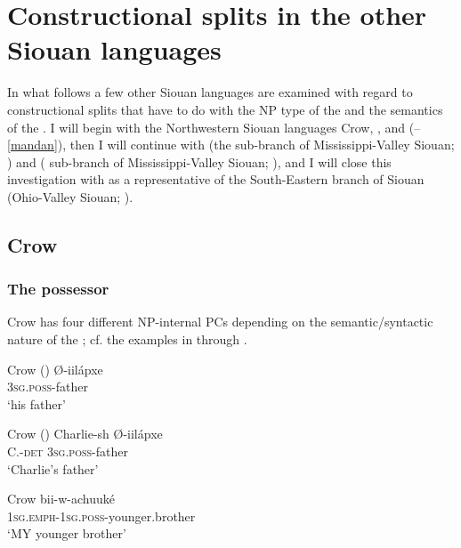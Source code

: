 \documentclass[output=paper]{LSP/langsci}
\begin{document}
\section{Constructional splits in the other Siouan languages}

In what follows a few other Siouan languages are examined with regard to constructional splits that have to do with the NP type of the  and the semantics of the . I will begin with the Northwestern Siouan languages Crow, , and  (--\ref{mandan}), then I will continue with  (the  sub-branch of Mississippi-Valley Siouan; ) and  ( sub-branch of Mississippi-Valley Siouan; ), and I will close this investigation with  as a representative of the South-Eastern branch of Siouan (Ohio-Valley Siouan; ).
 
\subsection{Crow}\label{sec:helmbrecht:4.1} \label{crow} 
\subsubsection{The possessor}
Crow has four different NP-internal PCs depending on the semantic/syntactic nature of the ; cf. the examples in  through . 

\ea {}Crow (\citealt[234]{Graczyk2007}) \label{crowfather}
\ex
\gll Ø-iilápxe \\
\textsc{3sg.poss}-father \\
\glt `his father'
\z
\z

\ea {}Crow (\citealt[234]{Graczyk2007}) \label{crowcharlie}
\ex
\gll Charlie-sh 		Ø-iilápxe \\
C.-\textsc{det}      \textsc{3sg.poss}-father \\
\glt `Charlie's father'
\z \z

\ea	{}Crow \citep[235]{Graczyk2007} \label{crowbrother}
\ex 
\gll bii-w-achuuké \\
\textsc{1sg.emph-1sg.poss}-younger.brother \\
\glt `MY younger brother'
\z \z
\end{document}
